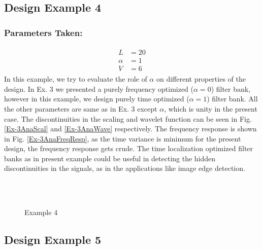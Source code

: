\subsection{Design Example 4}
\label{Design Example 4}
\subsubsection{Parameters Taken:}
\begin{eqnarray*}
\begin{aligned}
L &= 20\\
\alpha &= 1\\
V &= 6
\end{aligned}
\end{eqnarray*}
In this example, we try to evaluate the role of $\alpha$ on different properties of the design. In Ex. 3 we presented a purely frequency optimized ($\alpha=0$) filter bank, however in this example, we design purely time optimized ($\alpha=1$) filter bank. All the other parameters are same as in Ex. 3 except $\alpha$, which is unity in the present case. The discontinuities in the scaling and wavelet function can be seen in Fig. \ref{Ex-3AnaScal} and \ref{Ex-3AnaWave} respectively. The frequency response is shown in Fig. \ref{Ex-3AnaFreqResp}, as the time variance is minimum for the present design, the frequency response gets crude. The time localization optimized filter banks as in present example could be useful in detecting the hidden discontinuities in the signals, as in the applications like image edge detection.  
\begin{figure*}
\centering
{}\\
\\
%

\caption{Example 4}
\label{Example 4}
\end{figure*}

\subsection{Design Example 5}
\label{Design Example 5}
